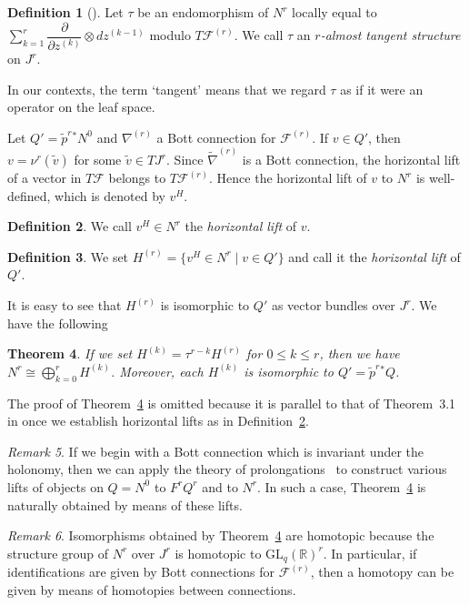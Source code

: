 \documentclass[12pt]{amsart}
\newcommand{\CF}{{\mathcal F}}
\newcommand{\R}{{\mathbb R}}
\newcommand{\GL}{\mathrm{GL}}
\newcommand{\pdif}[2]{\dfrac{\partial#1}{\partial#2}}
\newtheorem{theorem}{Theorem}[section]
\theoremstyle{definition}
\newtheorem{definition}[theorem]{Definition}
\theoremstyle{remark}
\newtheorem{remark}[theorem]{Remark}
\begin{document}
\begin{definition}[\cite{Bucataru}]
Let $\tau$ be an endomorphism of $N^r$ locally equal to $\sum_{k=1}^r\pdif{}{z^{(k)}}\otimes dz^{(k-1)}$ modulo $T\CF^{(r)}$.
We call $\tau$ an \textit{$r$-almost tangent structure} on $J^r$.
\end{definition}

In our contexts, the term `tangent' means that we regard $\tau$ as if it were an operator on the leaf space.

Let $Q'=\widetilde{p}^r{}^*N^0$ and $\nabla^{(r)}$ a Bott connection for $\mathcal{F}^{(r)}$.
If $v\in Q'$, then $v=\nu^r(\widetilde{v})$ for some $\widetilde{v}\in TJ^r$.
Since $\widetilde\nabla^{(r)}$ is a Bott connection, the horizontal lift of a vector in $T\CF$ belongs to $T\CF^{(r)}$.
Hence the horizontal lift of $v$ to $N^r$ is well-defined, which is denoted by $v^H$.

\begin{definition}
\label{def_a.3}
We call $v^H\in N^r$ the \textit{horizontal lift} of $v$.
\end{definition}

\begin{definition}
We set $H^{(r)}=\{v^H\in N^r\mid v\in Q'\}$ and call it the \textit{horizontal lift} of $Q'$.
\end{definition}

It is easy to see that $H^{(r)}$ is isomorphic to $Q'$ as vector bundles over $J^r$.
We have the following

\begin{theorem}
\label{thm_a.5}
If we set $H^{(k)}=\tau^{r-k}H^{(r)}$ for $0\leq k\leq r$, then we have $N^r\cong\bigoplus_{k=0}^rH^{(k)}$.
Moreover, each $H^{(k)}$ is isomorphic to $Q'=\widetilde{p}^r{}^*Q$.
\end{theorem}

The proof of Theorem~\ref{thm_a.5} is omitted because it is parallel to that of Theorem~3.1 in \cite{Bucataru} once we establish horizontal lifts as in Definition~\ref{def_a.3}.

\begin{remark}
If we begin with a Bott connection which is invariant under the holonomy, then we can apply the theory of prolongations~\cite{IY} to construct various lifts of objects on $Q=N^0$ to $F^rQ^r$ and to $N^r$.
In such a case, Theorem~\ref{thm_a.5} is naturally obtained by means of these lifts.
\end{remark}

\begin{remark}
Isomorphisms obtained by Theorem~\ref{thm_a.5} are homotopic because the structure group of $N^r$ over $J^r$ is homotopic to $\GL_q(\R)^r$.
In particular, if identifications are given by Bott connections for $\CF^{(r)}$, then a homotopy can be given by means of homotopies between connections.
\end{remark}
\end{document}
